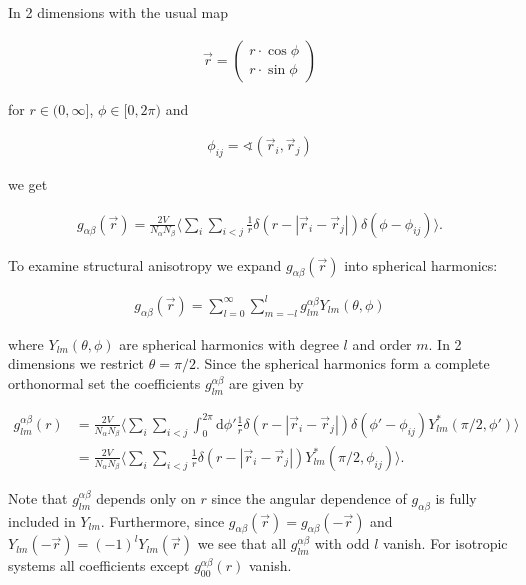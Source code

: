 \documentclass[DIV=9,11pt,BCOR=5mm,twoside=semi,abstract]{scrreprt}
\begin{document}
	In 2 dimensions with the usual map
	
	\begin{align}
		\vec{r} = 
		\begin{pmatrix}
			r \cdot \cos \phi\\
			r \cdot \sin \phi
		\end{pmatrix}
	\end{align}

	for $r\in (0, \infty]$, $\phi \in [0, 2\pi)$ and
	
	\begin{align}
		\phi_{ij} = \sphericalangle \left( \vec{r}_i,\vec{r}_j \right)
	\end{align}
	
	we get 
	
	\begin{align}
		g_{\alpha\beta}\left( \vec{r} \right) = \frac{2V}{N_{\alpha}N_{\beta}} \langle \sum_{i} \sum_{i < j} \frac{1}{r} \delta \left( r - | \vec{r}_i - \vec{r}_j | \right) \delta \left( \phi - \phi_{ij} \right) \rangle.
	\end{align}

	To examine structural anisotropy we expand $g_{\alpha\beta}(\vec{r})$ into spherical harmonics: 
	
	\begin{align}
		g_{\alpha\beta}(\vec{r}) = \sum_{l=0}^{\infty} \sum_{m=-l}^{l} g_{lm}^{\alpha\beta} Y_{lm}(\theta, \phi)
	\end{align}

	where $Y_{lm}(\theta, \phi)$ are spherical harmonics with degree $l$ and order $m$. In 2 dimensions we restrict $\theta = \pi/2$. Since the spherical harmonics form a complete orthonormal set the coefficients $g^{\alpha\beta}_{lm}$ are given by
	
	\begin{align}
		g^{\alpha\beta}_{lm} (r) &= \frac{2V}{N_{\alpha}N_{\beta}} \langle \sum_{i} \sum_{i < j} \int_{0}^{2\pi} \text{d}\phi' \frac{1}{r} \delta \left( r - | \vec{r}_i - \vec{r}_j | \right) \delta \left( \phi' - \phi_{ij} \right) Y_{lm}^{*}(\pi/2,\phi') \rangle \\
		&= \frac{2V}{N_{\alpha}N_{\beta}} \langle \sum_{i} \sum_{i < j} \frac{1}{r} \delta \left( r - | \vec{r}_i - \vec{r}_j | \right)  Y_{lm}^{*}(\pi/2,\phi_{ij}) \rangle.
	\end{align}

	Note that $g_{lm}^{\alpha\beta}$ depends only on $r$ since the angular dependence of $g_{\alpha\beta}$ is fully included in $Y_{lm}$. Furthermore, since $g_{\alpha\beta}(\vec{r}) = g_{\alpha\beta} (-\vec{r} )$ and $Y_{lm}(-\vec{r}) = (-1)^{l} Y_{lm}(\vec{r})$ we see that all $g_{lm}^{\alpha\beta}$ with odd $l$ vanish. For isotropic systems all coefficients except $g_{00}^{\alpha\beta}(r)$ vanish. \par
	
\end{document}
